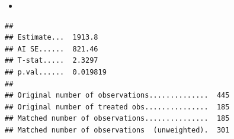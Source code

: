 \documentclass[ignorenonframetext,]{beamer}
\newenvironment{Shaded}{\begin{snugshade}}{\end{snugshade}}
\newcommand{\KeywordTok}[1]{\textcolor[rgb]{0.13,0.29,0.53}{\textbf{#1}}}
\newcommand{\DataTypeTok}[1]{\textcolor[rgb]{0.13,0.29,0.53}{#1}}
\newcommand{\DecValTok}[1]{\textcolor[rgb]{0.00,0.00,0.81}{#1}}
\newcommand{\StringTok}[1]{\textcolor[rgb]{0.31,0.60,0.02}{#1}}
\newcommand{\OperatorTok}[1]{\textcolor[rgb]{0.81,0.36,0.00}{\textbf{#1}}}
\newcommand{\NormalTok}[1]{#1}
\providecommand{\tightlist}{%
  \setlength{\itemsep}{0pt}\setlength{\parskip}{0pt}}
\begin{document}
\begin{frame}[fragile]{}

\begin{itemize}
\tightlist
\item
  \color{red}{Why is it necessary to match first?}
\end{itemize}

\small

\begin{Shaded}
\end{Shaded}

\begin{verbatim}
## 
## Estimate...  1913.8 
## AI SE......  821.46 
## T-stat.....  2.3297 
## p.val......  0.019819 
## 
## Original number of observations..............  445 
## Original number of treated obs...............  185 
## Matched number of observations...............  185 
## Matched number of observations  (unweighted).  301
\end{verbatim}

\normalsize

\end{frame}
\end{document}
